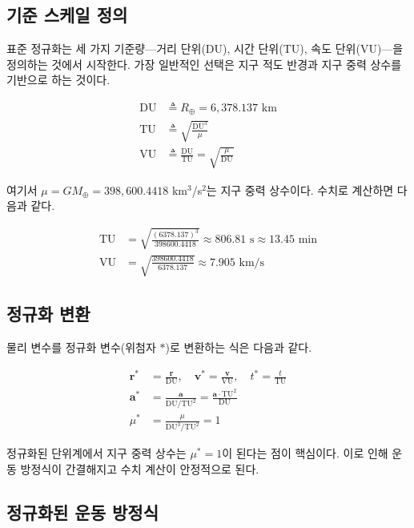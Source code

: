 \documentclass[11pt]{article}
\begin{document}
\subsection{기준 스케일 정의}

표준 정규화는 세 가지 기준량---거리 단위(DU), 시간 단위(TU), 속도 단위(VU)---을 정의하는 것에서 시작한다.
가장 일반적인 선택은 지구 적도 반경과 지구 중력 상수를 기반으로 하는 것이다.

\begin{align}
  \text{DU} &\triangleq R_\oplus = 6{,}378.137 \text{ km} \label{eq:DU}\\
  \text{TU} &\triangleq \sqrt{\frac{\text{DU}^3}{\mu}} \label{eq:TU}\\
  \text{VU} &\triangleq \frac{\text{DU}}{\text{TU}} = \sqrt{\frac{\mu}{\text{DU}}} \label{eq:VU}
\end{align}

여기서 $\mu = GM_\oplus = 398{,}600.4418$ km$^3$/s$^2$는 지구 중력 상수이다.
수치로 계산하면 다음과 같다.

\begin{align}
  \text{TU} &= \sqrt{\frac{(6378.137)^3}{398600.4418}} \approx 806.81 \text{ s} \approx 13.45 \text{ min}\\
  \text{VU} &= \sqrt{\frac{398600.4418}{6378.137}} \approx 7.905 \text{ km/s}
\end{align}

\subsection{정규화 변환}

물리 변수를 정규화 변수(위첨자 $*$)로 변환하는 식은 다음과 같다.

\begin{align}
  \mathbf{r}^* &= \frac{\mathbf{r}}{\text{DU}}, \quad
  \mathbf{v}^* = \frac{\mathbf{v}}{\text{VU}}, \quad
  t^* = \frac{t}{\text{TU}} \label{eq:transform}\\
  \mathbf{a}^* &= \frac{\mathbf{a}}{\text{DU}/\text{TU}^2} = \frac{\mathbf{a} \cdot \text{TU}^2}{\text{DU}} \label{eq:accel_transform}\\
  \mu^* &= \frac{\mu}{\text{DU}^3/\text{TU}^2} = 1 \label{eq:mu_star}
\end{align}

정규화된 단위계에서 지구 중력 상수는 $\mu^* = 1$이 된다는 점이 핵심이다.
이로 인해 운동 방정식이 간결해지고 수치 계산이 안정적으로 된다.

\subsection{정규화된 운동 방정식}
\end{document}
